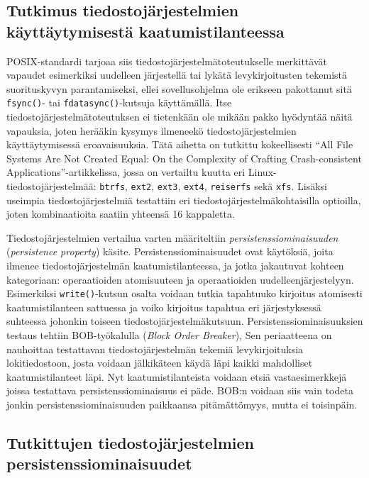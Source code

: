 \subsection{Tutkimus tiedostojärjestelmien käyttäytymisestä kaatumistilanteessa}
POSIX-standardi tarjoaa siis tiedostojärjestelmätoteutukselle merkittävät vapaudet esimerkiksi uudelleen järjestellä tai lykätä levykirjoitusten tekemistä suorituskyvyn parantamiseksi,
ellei sovellusohjelma ole erikseen pakottanut sitä \texttt{fsync()}- tai \texttt{fdatasync()}-kutsuja käyttämällä.
Itse tiedostojärjestelmätoteutuksen ei tietenkään ole mikään pakko hyödyntää näitä vapauksia,
joten herääkin kysymys ilmeneekö tiedostojärjestelmien käyttäytymisessä eroavaisuuksia.
Tätä aihetta on tutkittu kokeellisesti ``All File Systems Are Not Created Equal: On the Complexity of Crafting Crash-consistent Applications''\cite{PosixDataConsistency}-artikkelissa,
jossa on vertailtu kuutta eri Linux-tiedostojärjestelmää: \texttt{btrfs}, \texttt{ext2}, \texttt{ext3}, \texttt{ext4}, \texttt{reiserfs} sekä \texttt{xfs}.
Lisäksi useimpia tiedostojärjestelmiä testattiin eri tiedostojärjestelmäkohtaisilla optioilla,
joten kombinaatioita saatiin yhteensä 16 kappaletta.

Tiedostojärjestelmien vertailua varten määriteltiin \emph{persistenssiominaisuuden} (\emph{persistence property}) käsite.
Persistenssiominaisuudet ovat käytöksiä,
joita ilmenee tiedostojärjestelmän kaatumistilanteessa,
ja jotka jakautuvat kohteen kategoriaan: operaatioiden atomisuuteen ja operaatioiden uudelleenjärjestelyyn.
Esimerkiksi \texttt{write()}-kutsun osalta voidaan tutkia tapahtuuko kirjoitus atomisesti kaatumistilanteen sattuessa ja voiko kirjoitus tapahtua eri järjestyksessä suhteessa johonkin toiseen tiedostojärjestelmäkutsuun.
Persistenssiominaisuuksien testaus tehtiin BOB-työkalulla (\emph{Block Order Breaker}),
Sen periaatteena on nauhoittaa testattavan tiedostojärjestelmän tekemiä levykirjoituksia lokitiedostoon,
josta voidaan jälkikäteen käydä läpi kaikki mahdolliset kaatumistilanteet läpi.
Nyt kaatumistilanteista voidaan etsiä vastaesimerkkejä joissa testattava persistenssiominaisuus ei päde.
BOB:n voidaan siis vain todeta jonkin persistenssiominaisuuden paikkaansa pitämättömyys, mutta ei toisinpäin.

\subsection{Tutkittujen tiedostojärjestelmien persistenssiominaisuudet}
\newcommand{\atY}{$\bullet$}
\newcommand{\atN}{{\small $\times$}}

